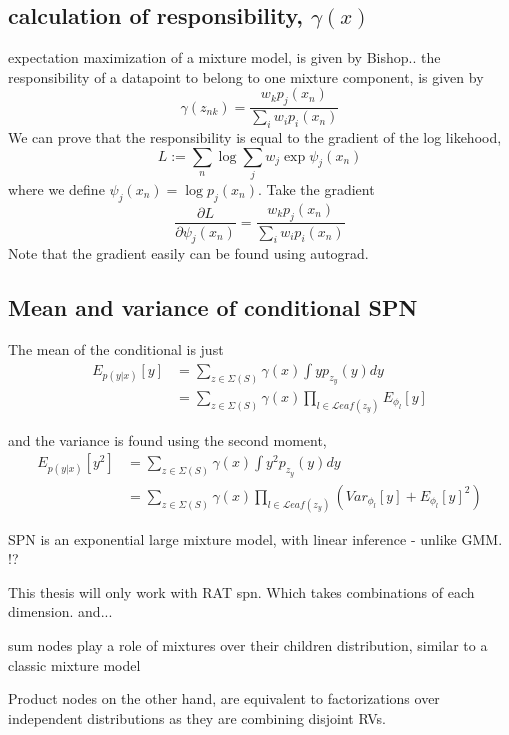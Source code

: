 \subsection{calculation of responsibility, $\gamma(x)$}
expectation maximization of a mixture model, is given by Bishop..
the responsibility of a datapoint to belong to one mixture component, is given by
$$\gamma(z_{nk}) = \frac{w_k p_j(x_n)}{\sum_i w_i p_i(x_n)}$$
We can prove that the responsibility is equal to the gradient of the log likehood, 
$$L:= \sum_n \log \sum_j w_j \exp \psi_j(x_n)$$
where we define $\psi_j(x_n) = \log p_j(x_n)$. Take the gradient 
$$\frac{\partial L}{\partial \psi_{j}(x_{n})} = \frac{w_k p_j(x_n)}{\sum_i w_i p_i(x_n)}$$
Note that the gradient easily can be found using autograd. 


\subsection{Mean and variance of conditional SPN}

The mean of the conditional is just
\begin{align*}
    E_{p(y|x)}[y] &= \sum_{z \in \Sigma(S)} \gamma(x) \int  y p_{z_y}(y) dy \\
    &= \sum_{z \in \Sigma(S)} \gamma(x) \prod_{l \in \mathcal{L}eaf(z_y)} E_{\phi_l}[y]
\end{align*}

and the variance is found using the second moment, 
\begin{align*}
    E_{p(y|x)}[y^2] &= \sum_{z \in \Sigma(S)} \gamma(x) \int  y^2 p_{z_y}(y) dy \\
    &= \sum_{z \in \Sigma(S)} \gamma(x) \prod_{l \in \mathcal{L}eaf(z_y)} (Var_{\phi_l}[y]+E_{\phi_l}[y]^2)
\end{align*}



SPN is an exponential large mixture model, with linear inference - unlike GMM. !?


This thesis will only work with RAT spn. Which takes combinations of each dimension. and...



sum nodes play a role of
mixtures over their children distribution, similar to a classic mixture model

Product
nodes on the other hand, are equivalent to factorizations over independent distributions as they are
combining disjoint RVs.

